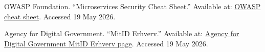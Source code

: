 \begin{enumerate}[label={\textbf{[\arabic*]}},leftmargin=2.4em]
  \item \hypertarget{ref:17}{}OWASP Foundation. ``Microservices Security Cheat Sheet.'' Available at: \href{https://cheatsheetseries.owasp.org/cheatsheets/Microservices_Security_Cheat_Sheet.html}{OWASP cheat sheet}. Accessed 19 May 2026.
  \item \hypertarget{ref:18}{}Agency for Digital Government. ``MitID Erhverv.'' Available at: \href{https://en.digst.dk/systems/mitid-erhverv/}{Agency for Digital Government MitID Erhverv page}. Accessed 19 May 2026.
\end{enumerate}
